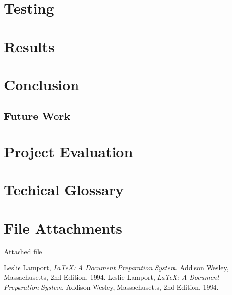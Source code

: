 \documentclass[12pt]{article}
\begin{document}
\section{Testing}\label{teting}
\section{Results}\label{results}
\section{Conclusion}\label{conclusion}
    \subsection{Future Work}\label{future}
\section{Project Evaluation}\label{evaluation}

\appendix
\section{Techical Glossary}\label{glossary}
    
\section{File Attachments}
     Attached file




\begin{thebibliography}{0}
     Leslie Lamport,
        \emph{\LaTeX: A Document Preparation System}.
        Addison Wesley, Massachusetts,
        2nd Edition,
        1994.
        Leslie Lamport,
        \emph{\LaTeX: A Document Preparation System}.
        Addison Wesley, Massachusetts,
        2nd Edition,
        1994.
\end{thebibliography}
\end{document}
